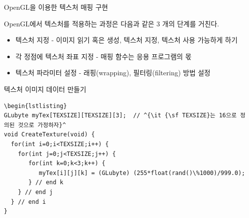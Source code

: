 \documentclass{beamer}
\begin{document}
\begin{frame}[fragile]{OpenGL을 이용한 텍스처 매핑 구현}

OpenGL에서 텍스처를 적용하는 과정은 다음과 같은 3 개의 단계를 거친다.
\begin{itemize}
\item {\small \sf 텍스처 지정  - 이미지 읽기 혹은 생성, 텍스처 지정, 텍스처 사용 가능하게 하기}
\item {\small \sf 각 정점에 텍스처 좌표 지정 - 매핑 함수는 응용 프로그램의 몫}
\item{\small \sf 텍스처 파라미터 설정 - 래핑(wrapping), 필터링(filtering) 방법 설정}
\end{itemize}

\end{frame}


\begin{frame}[fragile]{텍스처 이미지 데이터 만들기}

\lstset{language=C++, escapechar=^} 
\begin{lstlisting}
\begin{lstlisting}
GLubyte myTex[TEXSIZE][TEXSIZE][3];  // ^{\it {\sf TEXSIZE}는 16으로 정의된 것으로 가정하자}^
void CreateTexture(void) {
  for(int i=0;i<TEXSIZE;i++) {
    for(int j=0;j<TEXSIZE;j++) {
       for(int k=0;k<3;k++) {			
          myTex[i][j][k] = (GLubyte) (255*float(rand()\%1000)/999.0);
       } // end k
    } // end j
  } // end i
}
\end{lstlisting}

\end{frame}
\end{document}
